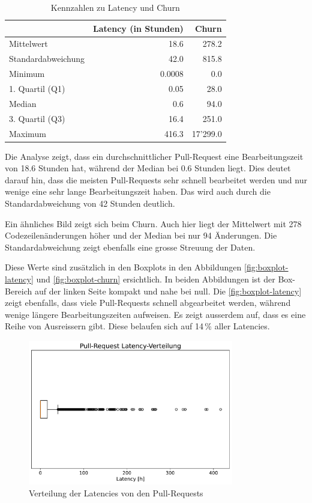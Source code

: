 \begin{table}[htbp]
    \centering
    \caption{Kennzahlen zu Latency und Churn}
    \begin{tabular}{@{}lrr@{}}
        \toprule
        \textbf & \textbf{Latency (in Stunden)} & \textbf{Churn} \\
         \midrule
        Mittelwert & 18.6 & 278.2 \\
        Standardabweichung &  42.0  & 815.8 \\
        Minimum & 0.0008 & 0.0 \\
        1. Quartil (Q1) & 0.05 & 28.0 \\
        Median & 0.6 & 94.0 \\
        3. Quartil (Q3) &  16.4   & 251.0 \\
        Maximum & 416.3 & 17'299.0 \\
        \bottomrule
    \end{tabular}
    \label{tab:deskriptive-kennzahlen}
\end{table}

Die Analyse zeigt, dass ein durchschnittlicher Pull-Request eine Bearbeitungszeit von 18.6 Stunden hat, während der Median bei 0.6 Stunden liegt. Dies deutet darauf hin, dass die meisten Pull-Requests sehr schnell bearbeitet werden und nur wenige eine sehr lange Bearbeitungszeit haben. Das wird auch durch die Standardabweichung von 42 Stunden deutlich.

Ein ähnliches Bild zeigt sich beim Churn. Auch hier liegt der Mittelwert mit 278 Codezeilenänderungen höher und der Median bei nur 94 Änderungen. Die Standardabweichung zeigt ebenfalls eine grosse Streuung der Daten.

Diese Werte sind zusätzlich in den Boxplots in den Abbildungen \autoref{fig:boxplot-latency} und \autoref{fig:boxplot-churn} ersichtlich. 
In beiden Abbildungen ist der Box-Bereich auf der linken Seite kompakt und nahe bei null. 
Die \autoref{fig:boxplot-latency} zeigt ebenfalls, dass viele Pull-Requests schnell abgearbeitet werden, während wenige längere Bearbeitungszeiten aufweisen. Es zeigt ausserdem auf, dass es eine Reihe von Ausreissern gibt. Diese belaufen sich auf 14\,\% aller Latencies.

\begin{figure}[htbp]
    \includegraphics[width=0.8\textwidth]{Figures/boxplot-latency.pdf}
    \centering
    \caption{Verteilung der Latencies von den Pull-Requests}
    \label{fig:boxplot-latency}
\end{figure}

